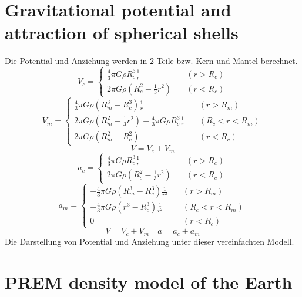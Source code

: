 \documentclass[12pt]{article}
\begin{document}
\section{Gravitational potential and attraction of spherical shells}
Die Potential und Anziehung werden in 2 Teile bzw. Kern und Mantel berechnet. 
\[ V_{c} = \begin{cases}
\frac{4}{3} \pi G \rho R_c^3 \frac{1}{r} \quad &(r > R_c)\\
2 \pi G \rho (R_c^2 - \frac{1}{3} r^2) \quad  &(r < R_c)
\end{cases}
\]
\[ V_{m} = \begin{cases}
\frac{4}{3} \pi G \rho (R_m^3 - R_c^3) \frac{1}{r} \quad &(r > R_m) \\
2 \pi G \rho (R_m^2 - \frac{1}{3} r^2) - \frac{4}{3} \pi G \rho R_c^3 \frac{1}{r} \quad &(R_c < r < R_m) \\
2 \pi G \rho (R_m^2 - R_c^2) \quad &(r < R_c)
\end{cases}
\]
\begin{equation*}
V = V_c + V_m
\end{equation*}
\[ a_{c} = \begin{cases}
\frac{4}{3} \pi G \rho R_c^3 \frac{1}{r} \quad &(r > R_c)\\
2 \pi G \rho (R_c^2 - \frac{1}{3} r^2) \quad  &(r < R_c)
\end{cases}
\]
\[ a_{m} = \begin{cases}
- \frac{4}{3} \pi G \rho (R_m^3 - R_c^3) \frac{1}{r^2} \quad &(r > R_m) \\
- \frac{4}{3} \pi G \rho (r^3 - R_c^3) \frac{1}{r^2} \quad &(R_c < r < R_m) \\
0 \quad \quad \quad \quad \quad \quad \quad \quad \quad &(r < R_c)
\end{cases}
\]
\newline
\begin{equation*}
V = V_c + V_m \quad a = a_c + a_m
\end{equation*}
Die Darstellung von Potential und Anziehung unter dieser vereinfachten Modell. 

\newpage
\section{PREM density model of the Earth}
\end{document}
